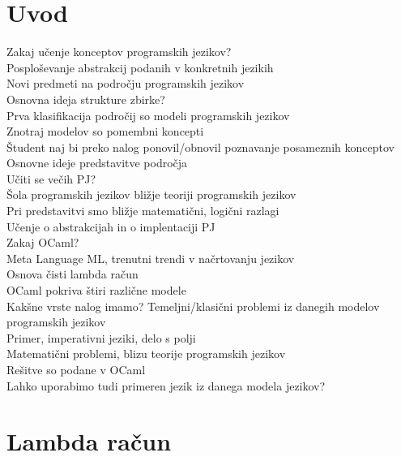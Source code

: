 
\chapter{Uvod}

Zakaj učenje konceptov programskih jezikov? \\
Posploševanje abstrakcij podanih v konkretnih jezikih \\
Novi predmeti na področju programskih jezikov \\

Osnovna ideja strukture zbirke? \\
Prva klasifikacija področij so modeli programskih jezikov \\
Znotraj modelov so pomembni koncepti \\
Študent naj bi preko nalog ponovil/obnovil poznavanje posameznih konceptov \\

Osnovne ideje predstavitve področja \\
Učiti se večih PJ? \\
Šola programskih jezikov bližje teoriji programskih jezikov \\
Pri predstavitvi smo bližje matematični, logični razlagi \\
Učenje o abstrakcijah in o implentaciji PJ \\

Zakaj OCaml? \\
Meta Language ML, trenutni trendi v načrtovanju jezikov \\ 
Osnova čisti lambda račun \\
OCaml pokriva štiri različne modele \\

Kakšne vrste nalog imamo?
Temeljni/klasični problemi iz danegih modelov programskih jezikov \\
Primer, imperativni jeziki, delo s polji \\
Matematični problemi, blizu teorije programskih jezikov \\

Rešitve so podane v OCaml \\
Lahko uporabimo tudi primeren jezik iz danega modela jezikov? \\



\chapter{Lambda ra\v cun}


